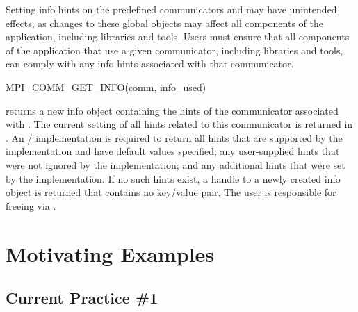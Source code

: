 \begin{users}
Setting info hints on the predefined communicators 
and  may have unintended effects, as changes to these
global objects may affect all components of the application, including
libraries and tools.
Users must ensure that all components of the application that use a given
communicator, including libraries and tools, can comply with any info hints
associated with that communicator.
\end{users}

%
\begin{funcdef}{MPI\_COMM\_GET\_INFO}{(\mbox{comm}, \mbox{info\_used})}
\end{funcdef}

 returns a new info object containing
the hints of the communicator associated with .
The current setting of all hints related to this communicator is
returned in . An \MPI/ implementation is required to
return all hints that are supported by the implementation and have
default values specified; any user-supplied hints that were not ignored
by the implementation; and any additional hints that were set by
the implementation.
If no such hints
exist, a handle to a newly created info object is returned that
contains no key/value pair. The user is responsible for freeing
 via .


\section{Motivating Examples}
\label{sec:context:examples}

\subsection{Current Practice \#1}

